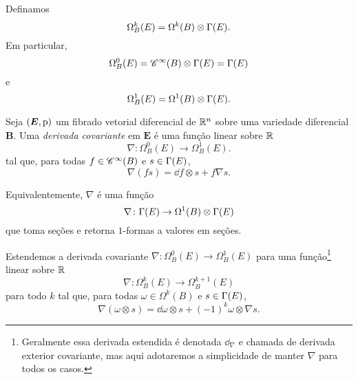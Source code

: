Definamos
	\begin{equation*}
	\Omega^k_B(E) = \Omega^k(B) \otimes \Gamma(E).
	\end{equation*}
Em particular,
	\begin{equation*}
	\Omega^0_B(E) = \mathscr{C}^\infty(B) \otimes \Gamma(E) = \Gamma(E)
	\end{equation*}
e
	\begin{equation*}
	\Omega^1_B(E) = \Omega^1(B) \otimes \Gamma(E).
	\end{equation*}

\begin{definition}
Seja $(\bm E,\mathrm{p})$ um fibrado vetorial diferencial de $\mathbb{R}^n$ sobre uma variedade diferencial $\bm B$. Uma \emph{derivada covariante} em $\bm E$ é uma função linear sobre $\mathbb{R}$
	\begin{equation*}
	\nabla\colon \Omega^0_B(E) \to \Omega^1_B(E).
	\end{equation*}
tal que, para todas $f \in \mathscr{C}^\infty(B)$ e $s \in \Gamma(E)$,
	\begin{equation*}
	\nabla(fs) = \dd f \otimes s + f \nabla s.
	\end{equation*}
\end{definition}

Equivalentemente, $\nabla$ é uma função
	\begin{equation*}
	\nabla\colon \Gamma(E) \to \Omega^1(B) \otimes \Gamma(E)
	\end{equation*}
que toma seções e retorna $1$-formas a valores em seções.


Estendemos a derivada covariante $\nabla\colon \Omega^0_B(E) \to \Omega^1_B(E)$ para uma função\footnote{Geralmente essa derivada estendida é denotada $\dd_\nabla$ e chamada de derivada exterior covariante, mas aqui adotaremos a simplicidade de manter $\nabla$ para todos os casos.} linear sobre $\mathbb{R}$
	\begin{equation*}
	\nabla\colon \Omega^k_B(E) \to \Omega^{k+1}_B(E)
	\end{equation*}
para todo $k$ tal que, para todas $\omega \in \Omega^k(B)$ e $s \in \Gamma(E)$,
	\begin{equation*}
	\nabla(\omega \otimes s) = \dd \omega \otimes s + (-1)^k \omega \otimes \nabla s.
	\end{equation*}









